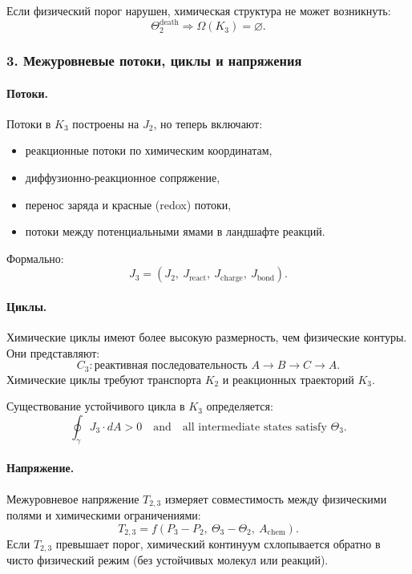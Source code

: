 Если физический порог нарушен, химическая структура не может возникнуть:
\[
\Theta_2^{\mathrm{death}} \Rightarrow \Omega(K_3)=\varnothing.
\]

\subsubsection{3. Межуровневые потоки, циклы и напряжения}

\paragraph{Потоки.}
Потоки в $K_3$ построены на $J_2$, но теперь включают:
\begin{itemize}
  \item реакционные потоки по химическим координатам,
  \item диффузионно-реакционное сопряжение,
  \item перенос заряда и красные (redox) потоки,
  \item потоки между потенциальными ямами в ландшафте реакций.
\end{itemize}

Формально:
\[
J_3 = (J_2,\ J_{\mathrm{react}},\ J_{\mathrm{charge}},\ J_{\mathrm{bond}}).
\]

\paragraph{Циклы.}
Химические циклы имеют более высокую размерность, чем физические контуры.
Они представляют:
\[
C_3 : \text{реактивная последовательность } A \rightarrow B \rightarrow C \rightarrow A.
\]
Химические циклы требуют транспорта $K_2$ и реакционных траекторий $K_3$.

Существование устойчивого цикла в $K_3$ определяется:
\[
\oint_{\gamma} J_3 \cdot dA > 0
\quad\text{and}\quad
\text{all intermediate states satisfy }\Theta_3.
\]

\paragraph{Напряжение.}
Межуровневое напряжение $T_{2,3}$ измеряет совместимость между физическими
полями и химическими ограничениями:
\[
T_{2,3} = f(P_3 - P_2,\ \Theta_3 - \Theta_2,\ A_{\mathrm{chem}}).
\]
Если $T_{2,3}$ превышает порог, химический континуум схлопывается обратно в
чисто физический режим (без устойчивых молекул или реакций).

